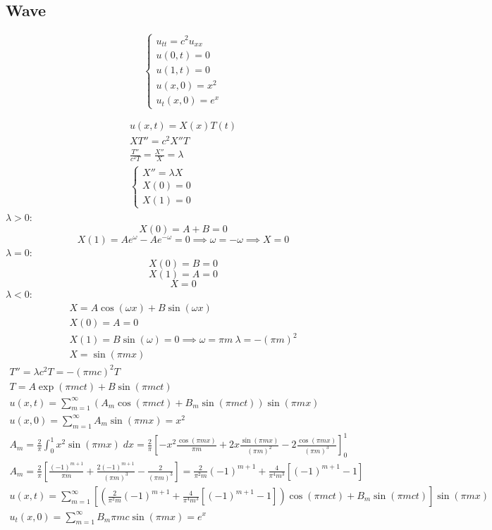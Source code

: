 \documentclass[10pt]{article}
\begin{document}
\subsection{Wave}
\[\begin{cases}
    u_{tt} = c^2 u_{xx}\\
    u(0, t) = 0\\
    u(1, t) = 0\\
    u(x, 0) = x^2\\
    u_t(x, 0) = e^x
\end{cases}\]

\begin{gather*}
    u(x, t) = X(x)T(t)\\
    XT'' = c^2 X''T\\
    \frac{T''}{c^2T} = \frac{X''}{X} = \lambda\\
    \begin{cases}
        X'' = \lambda X\\
        X(0) = 0\\
        X(1) = 0
    \end{cases}
\end{gather*}
$\lambda >0$: 
\[X(0) = A + B = 0\]
\[X(1) = Ae^{\omega} - Ae^{-\omega} = 0 \implies \omega = -\omega \implies X = 0\]
$\lambda = 0$:
\[X(0) = B = 0\]
\[X(1) = A = 0\]
\[X = 0\]
$\lambda <0$:
\begin{gather*}
    X = A\cos(\omega x) + B\sin(\omega x)\\
    X(0) = A = 0\\
    X(1) = B\sin(\omega) = 0 \implies \omega = \pi m\
    \lambda = -(\pi m)^2\\
    X = \sin(\pi mx)
\end{gather*}
\begin{gather*}
    T'' = \lambda c^2T = -(\pi mc)^2 T\\
    T = A\exp(\pi mct) + B\sin(\pi mct)\\
    u(x, t) = \sum_{m=1}^\infty (A_m\cos(\pi mct) + B_m\sin(\pi mct))\sin(\pi mx)\\
    u(x, 0) = \sum_{m=1}^\infty A_m\sin(\pi mx) = x^2\\
    A_m = \frac{2}{\pi}\int_0^1 x^2\sin(\pi mx)\; dx = \frac{2}{\pi}\left[-x^2\frac{\cos(\pi mx)}{\pi m}+ 2x\frac{\sin(\pi mx)}{(\pi m)^2} - 2\frac{\cos(\pi mx)}{(\pi m)^3}\right]_0^1\\
    A_m = \frac{2}{\pi}\left[\frac{(-1)^{m+1}}{\pi m}+ \frac{2(-1)^{m+1}}{(\pi m)^3} - \frac{2}{(\pi m)^3}\right] = \frac{2}{\pi^2m}(-1)^{m+1} + \frac{4}{\pi^4m^3}[(-1)^{m+1} - 1]\\
    u(x, t) = \sum_{m=1}^\infty \left[\left(\frac{2}{\pi^2m}(-1)^{m+1} + \frac{4}{\pi^4m^3}[(-1)^{m+1} - 1]\right)\cos(\pi mct) + B_m\sin(\pi mct)\right]\sin(\pi mx)\\
    u_t(x, 0) = \sum_{m=1}^\infty B_m \pi mc\sin(\pi mx) = e^x
\end{gather*}
\end{document}

